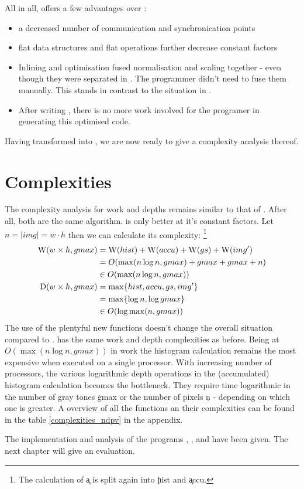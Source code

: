   All in all, \ndpv offers a few advantages over \ndpn:
  \begin{itemize}
    \item a decreased number of communication and synchronication points
    \item flat data structures and flat operations further decrease constant factors
    \item Inlining and optimisation fused
          normalisation and scaling together - even though
          they were separated in \ndpn. The programmer didn't
          need to fuse them manually. This stands in contrast to the situation in \man.
    \item After writing \ndpn, there is no more work involved for the programer in generating this optimised code.
  \end{itemize}
  Having transformed \ndpn into \ndpv, we are now ready to give a complexity analysis thereof.
  
\section{Complexities}
  The complexity analysis for work and depths remains similar to that of \ndpn.
  After all, both are the same algorithm. \ndpv is only better at it's constant factors.
  Let $n = |img| = w\cdot h$ then we can calculate its complexity:
  \footnote{
  The calculation of \c{a} is split again into \c{hist} and \c{accu}.
  }
  \begin{equation*}
  \begin{split}
  \W(w \times h,gmax)
        & = \W(hist) + \W(accu) + \W(gs) + \comment{\W(expandPS) +} \W(img') \\
        & = O( \max(n \log n, gmax) + gmax + gmax \comment{ + 1} + n) \\
        & \in O(\max(n \log n, gmax)) \\
  \D(w \times h,gmax)
      & = \max \{ hist, accu, gs\comment{, expandPS}, img'\} \\
      & = \max \{\log n, \log gmax \} \\
      & \in O(\log \max(n,gmax)) \\
  \end{split}
  \end{equation*}
  The use of the plentyful new functions doesn't change the overall situation compared to \ndpn.
  \ndpv has the same work and depth complexities as before.
  Being at $O(\max(n \log n,gmax))$ in work
  the histogram calculation remains the most expensive when executed on a single processor.
  With increasing number of processors, the various logarithmic depth
  operations in the (accumulated) histogram calculation becomes the bottleneck.
  They require time logarithmic in the number of gray tones \c{gmax} or the number
  of pixels \c{n} - depending on which one is greater.
  A overview of all the functions an their complexities can be found in the table \ref{complexities_ndpv} in the appendix.
  
  
  The implementation and analysis of the programs \seq, \man, \ndpn and \ndpv
  have been given. The next chapter will give an evaluation.


  
